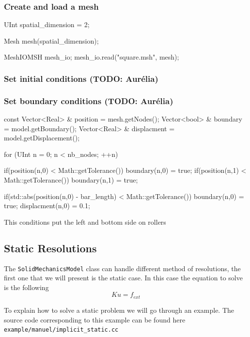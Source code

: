 \documentclass[a4paper,11pt]{book}
\newcommand{\code}[1]{{\tt{#1}}}
\newcommand{\todo}[1]{({\small\color{red}\textbf{TODO: }\textbf{#1}})}
\begin{document}
\subsubsection{Create and load a mesh\label{sect:common:mesh}}


\begin{cpp}
  UInt spatial_dimension = 2;

  Mesh mesh(spatial_dimension);

  MeshIOMSH mesh_io;
  mesh_io.read("square.msh", mesh);
\end{cpp}

\subsubsection{Set initial conditions \todo{Aur\'elia}}
\subsubsection{Set boundary conditions\label{sect:smm:boundary} \todo{Aur\'elia}}

\begin{cpp}
  const  Vector<Real> & position = mesh.getNodes();
  Vector<bool> & boundary = model.getBoundary();
  Vector<Real> & displacment = model.getDisplacement();

  for (UInt n = 0; n < nb_nodes; ++n) {
    if(position(n,0) < Math::getTolerance()) boundary(n,0) = true;
    if(position(n,1) < Math::getTolerance()) boundary(n,1) = true;

    if(std::abs(position(n,0) - bar_length) < Math::getTolerance()) {
      boundary(n,0) = true;
      displacment(n,0) = 0.1;
    }
  }
\end{cpp}

This conditions put the left and bottom side on rollers

\subsection{Static Resolutions\label{sect:smm:static}}

The \code{SolidMechanicsModel} class can handle different method of resolutions,
the first one that we will present is the static case. In this case the equation
to solve is the following
\begin{equation}\label{eq:smm:static}
  K u = f_{ext}
\end{equation}

To explain  how to solve  a static  problem we will  go through an  example. The
source   code    corresponding   to   this    example   can   be    found   here
\code{example/manuel/implicit\_static.cc}
\end{document}
